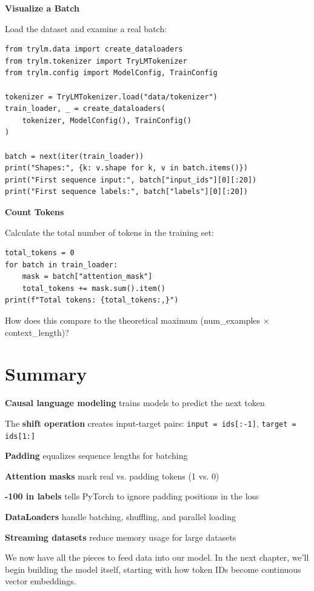 \begin{exercise}
\textbf{Visualize a Batch}

Load the dataset and examine a real batch:
\begin{lstlisting}[style=python, numbers=none]
from trylm.data import create_dataloaders
from trylm.tokenizer import TryLMTokenizer
from trylm.config import ModelConfig, TrainConfig

tokenizer = TryLMTokenizer.load("data/tokenizer")
train_loader, _ = create_dataloaders(
    tokenizer, ModelConfig(), TrainConfig()
)

batch = next(iter(train_loader))
print("Shapes:", {k: v.shape for k, v in batch.items()})
print("First sequence input:", batch["input_ids"][0][:20])
print("First sequence labels:", batch["labels"][0][:20])
\end{lstlisting}
\end{exercise}

\begin{exercise}
\textbf{Count Tokens}

Calculate the total number of tokens in the training set:
\begin{lstlisting}[style=python, numbers=none]
total_tokens = 0
for batch in train_loader:
    mask = batch["attention_mask"]
    total_tokens += mask.sum().item()
print(f"Total tokens: {total_tokens:,}")
\end{lstlisting}

How does this compare to the theoretical maximum (num\_examples $\times$ context\_length)?
\end{exercise}

\section{Summary}

\begin{summary}
    \item \textbf{Causal language modeling} trains models to predict the next token
    \item The \textbf{shift operation} creates input-target pairs: \texttt{input = ids[:-1]}, \texttt{target = ids[1:]}
    \item \textbf{Padding} equalizes sequence lengths for batching
    \item \textbf{Attention masks} mark real vs. padding tokens (1 vs. 0)
    \item \textbf{-100 in labels} tells PyTorch to ignore padding positions in the loss
    \item \textbf{DataLoaders} handle batching, shuffling, and parallel loading
    \item \textbf{Streaming datasets} reduce memory usage for large datasets
\end{summary}

We now have all the pieces to feed data into our model. In the next chapter, we'll begin building the model itself, starting with how token IDs become continuous vector embeddings.
